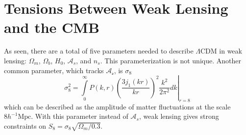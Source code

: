 \section{Tensions Between Weak Lensing and the CMB}
As seen, there are a total of five parameters needed to describe $\Lambda$CDM in weak lensing: $\Omega_m$, $\Omega_b$, $H_0$, $\mathcal{A}_s$, and $n_s$. This parameterization is not unique. Another common parameter, which tracks $\mathcal{A_s}$, is $\sigma_8$
\begin{equation}
	\sigma_8^2 = \left.\int\limits_0^\infty P(k,r)\left(\frac{3j_1(kr)}{kr}\right)^2\frac{k^2}{2\pi^2}dk\right|_{r=8}
\end{equation}
which can be described as the amplitude of matter fluctuations at the scale $8 h^{-1}\mathrm{Mpc}$. With this parameter instead of $\mathcal{A}_s$, weak lensing gives strong constraints on $S_8 = \sigma_8\sqrt{\Omega_m/0.3}$. 

